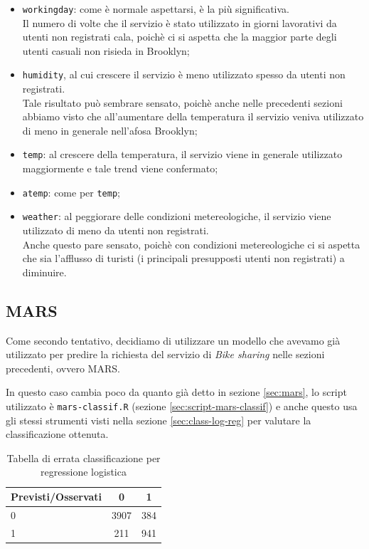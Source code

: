 \begin{itemize}
\item \texttt{workingday}: come è normale aspettarsi, è la più significativa.\\
  Il numero di volte che il servizio è stato utilizzato in giorni lavorativi
  da utenti non registrati cala, poichè ci si aspetta che la maggior parte
  degli utenti casuali non risieda in Brooklyn;
\item \texttt{humidity}, al cui crescere il servizio è meno utilizzato spesso
  da utenti non registrati. \\
  Tale risultato può sembrare sensato, poichè anche nelle precedenti sezioni
  abbiamo visto che all'aumentare della temperatura il servizio veniva
  utilizzato di meno in generale nell'afosa Brooklyn;
\item \texttt{temp}: al crescere della temperatura, il servizio viene in
  generale utilizzato maggiormente e tale trend viene confermato;
\item \texttt{atemp}: come per \texttt{temp};
\item \texttt{weather}: al peggiorare delle condizioni metereologiche, il
  servizio viene utilizzato di meno da utenti non registrati. \\
  Anche questo pare sensato, poichè con condizioni metereologiche ci si
  aspetta che sia l'afflusso di turisti (i principali presupposti utenti non
  registrati) a diminuire.
\end{itemize}


\subsection{MARS}\label{sec:class-mars}

Come secondo tentativo, decidiamo di utilizzare un modello che avevamo già
utilizzato per predire la richiesta del servizio di \emph{Bike sharing} nelle
sezioni precedenti, ovvero MARS.

In questo caso cambia poco da quanto già detto in sezione \ref{sec:mars}, lo
script utilizzato è \texttt{mars-classif.R} (sezione
\ref{sec:script-mars-classif}) e anche questo usa gli stessi strumenti visti
nella sezione \ref{sec:class-log-reg} per valutare la classificazione ottenuta.

\begin{table}[H]
\begin{center}
\begin{tabular}{ | l || c | c | }
  \hline
    Previsti/Osservati & 0 & 1 \\ \hline \hline
    0 & 3907 & 384 \\ \hline
    1 & 211 & 941 \\ \hline
\end{tabular}
  \caption{Tabella di errata classificazione per regressione logistica}
\end{center}
\end{table}

